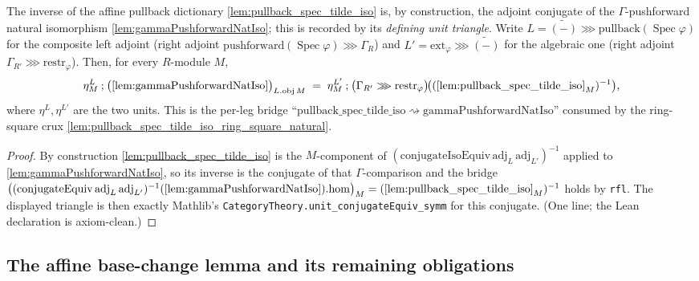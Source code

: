 \begin{lemma}


  \label{lem:pullback_spec_tilde_iso_inv_unit_triangle}
  The inverse of the affine pullback dictionary \cref{lem:pullback_spec_tilde_iso} is, by
  construction, the adjoint conjugate of the \(\Gamma\)-pushforward natural isomorphism
  \cref{lem:gammaPushforwardNatIso}; this is recorded by its \emph{defining unit triangle}.
  Write \(L = \widetilde{(-)} \ggg \mathrm{pullback}(\operatorname{Spec}\varphi)\) for the
  composite left adjoint (right adjoint \(\mathrm{pushforward}(\operatorname{Spec}\varphi)\ggg
  \Gamma_R\)) and \(L' = \mathrm{ext}_\varphi \ggg \widetilde{(-)}\) for the algebraic one
  (right adjoint \(\Gamma_{R'}\ggg\mathrm{restr}_\varphi\)). Then, for every \(R\)-module \(M\),
  \[
    \eta^{L}_M \mathbin{;} \bigl(\text{\cref{lem:gammaPushforwardNatIso}}\bigr)_{L.\mathrm{obj}\,M}
      \;=\;
    \eta^{L'}_M \mathbin{;} \bigl(\Gamma_{R'}\ggg\mathrm{restr}_\varphi\bigr)
              \!\bigl((\text{\cref{lem:pullback_spec_tilde_iso}}_M)^{-1}\bigr),
  \]
  where \(\eta^{L}, \eta^{L'}\) are the two units. This is the per-leg bridge
  ``\(\mathrm{pullback\_spec\_tilde\_iso}\rightsquigarrow\mathrm{gammaPushforwardNatIso}\)''
  consumed by the ring-square crux \cref{lem:pullback_spec_tilde_iso_ring_square_natural}.
  \begin{proof}
    By construction \cref{lem:pullback_spec_tilde_iso} is the \(M\)-component of
    \((\mathrm{conjugateIsoEquiv}\,\mathrm{adj}_L\,\mathrm{adj}_{L'})^{-1}\) applied to
    \cref{lem:gammaPushforwardNatIso}, so its inverse is the conjugate of that
    \(\Gamma\)-comparison and the bridge
    \(\bigl((\mathrm{conjugateEquiv}\,\mathrm{adj}_L\,\mathrm{adj}_{L'})^{-1}
    (\text{\cref{lem:gammaPushforwardNatIso}}).\mathrm{hom}\bigr)_M
    = (\text{\cref{lem:pullback_spec_tilde_iso}}_M)^{-1}\) holds by \texttt{rfl}. The displayed
    triangle is then exactly Mathlib's \texttt{CategoryTheory.unit\_conjugateEquiv\_symm} for this
    conjugate. (One line; the Lean declaration is axiom-clean.)
  \end{proof}
\end{lemma}

\subsection{The affine base-change lemma and its remaining obligations}

